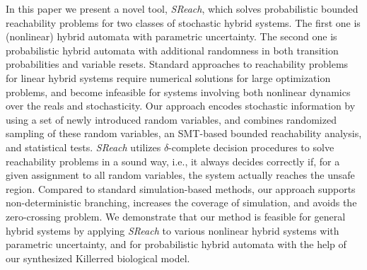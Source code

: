 In this paper we present a novel tool, {\it SReach}, which solves probabilistic bounded reachability problems for two classes of stochastic hybrid systems. The first one is (nonlinear) hybrid automata with parametric uncertainty. The second one is probabilistic hybrid automata with additional randomness in both transition probabilities and variable resets. Standard approaches to reachability problems for linear hybrid systems require numerical solutions for large optimization problems, and become infeasible for systems involving both nonlinear dynamics over the reals and stochasticity. Our approach encodes stochastic information by using a set of newly introduced random variables, and combines randomized sampling of these random variables, an SMT-based bounded reachability analysis, 
and statistical tests. {\it SReach} utilizes $\delta$-complete decision procedures 
to solve reachability problems in a sound way, i.e., it always decides correctly if, for a given
assignment to all random variables, the system actually reaches the unsafe region.
Compared to standard simulation-based methods, our approach supports 
non-deterministic branching, increases the coverage of simulation, and avoids the
zero-crossing problem. We demonstrate that our method is feasible for general
hybrid systems by applying {\it SReach} to
various nonlinear hybrid systems with parametric uncertainty, and for probabilistic hybrid automata with the help of our synthesized  Killerred biological model.
